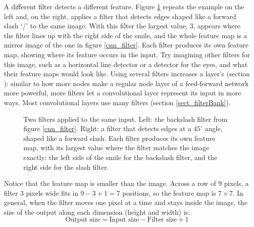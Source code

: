 A different filter detects a different feature. Figure \ref{cnn_filter2} repeats the example on the left and, on the right, applies a filter that detects edges shaped like a forward slash `/' to the same image. With this filter the largest value, 3, appears where the filter lines up with the right side of the smile, and the whole feature map is a mirror image of the one in figure \ref{cnn_filter}. Each filter produces its own feature map, showing where its feature occurs in the input. Try imagining other filters for this image, such as a horizontal line detector or a detector for the eyes, and what their feature maps would look like. Using several filters increases a layer's  (section ): similar to how more nodes make a regular node layer of a feed-forward network more powerful, more filters let a convolutional layer represent its input in more ways. Most convolutional layers use many filters (section \ref{sect_filterBank}).

\begin{figure}[h]
\centering
{}
\caption[Jeff Yoshimi.]{Two filters applied to the same input. Left: the backslash filter from figure \ref{cnn_filter}. Right: a filter that detects edges at a $45^\circ$ angle, shaped like a forward slash. Each filter produces its own feature map, with its largest value where the filter matches the image exactly: the left side of the smile for the backslash filter, and the right side for the slash filter.}
\label{cnn_filter2}
\end{figure}

Notice that the feature map is smaller than the image. Across a row of 9 pixels, a filter 3 pixels wide fits in $9 - 3 + 1 = 7$ positions, so the feature map is $7 \times 7$. In general, when the filter moves one pixel at a time and stays inside the image, the size of the output along each dimension (height and width) is:
\begin{equation}\label{eq:sliding_window}
\text{Output size} = \text{Input size} - \text{Filter size} + 1
\end{equation}

